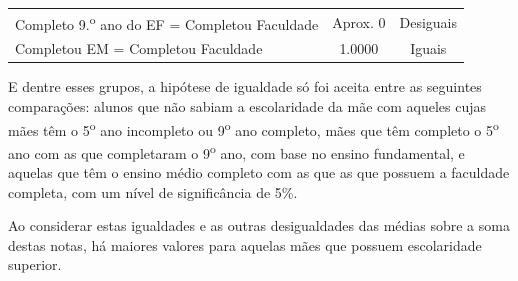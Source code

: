 \begin{table}[htb]
\begin{tabular}{lcc}
    Completo 9.\textsuperscript{o} ano do EF = Completou Faculdade & Aprox. 0 & Desiguais\\
    Completou EM = Completou Faculdade & 1.0000 & Iguais\\
    \bottomrule
    \end{tabular}
    \centering
    
  \end{table}

E dentre esses grupos, a hipótese de igualdade só foi aceita entre as seguintes comparações: alunos que não sabiam
a escolaridade da mãe com aqueles cujas mães têm o 5\textsuperscript{o} ano incompleto ou 9\textsuperscript{o} ano completo,
mães que têm completo o 5\textsuperscript{o} ano com as que completaram o 9\textsuperscript{o} ano, com base no ensino fundamental,
e aquelas que têm o ensino médio completo com as que as que possuem a faculdade completa, com um nível de significância de 5\%.

Ao considerar estas igualdades e as outras desigualdades das médias sobre a soma destas notas, há maiores valores para aquelas mães que possuem
escolaridade superior.